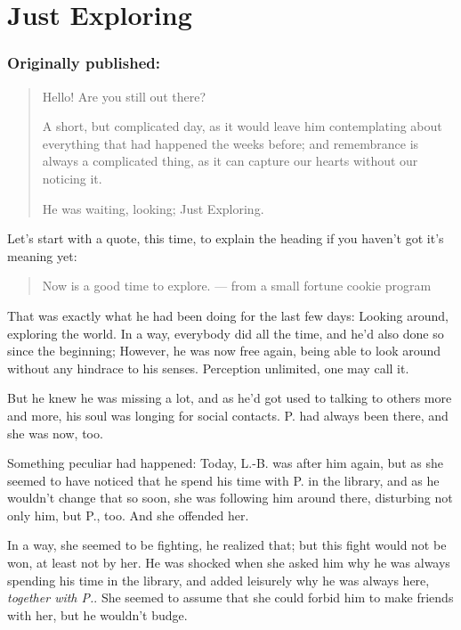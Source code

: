 \chapter{Just Exploring}
\label{cha:just-exploring}
\subsection*{Originally published: }
\begin{quote}
Hello! Are you still out there?

A short, but complicated day, as it would leave him contemplating about everything that had happened the weeks before; and remembrance is always a complicated thing, as it can capture our hearts without our noticing it.

He was waiting, looking; Just Exploring.
\end{quote}

Let's start with a quote, this time, to explain the heading if you haven't got it's meaning yet: 
\begin{verse}
  Now is a good time to explore.
  --- from a small fortune cookie program
\end{verse}
That was exactly what he had been doing for the last few days: Looking around, exploring the world. In a way, everybody did all the time, and he'd also done so since the beginning; However, he was now free again, being able to look around without any hindrace to his senses. 
Perception unlimited, one may call it.

But he knew he was missing a lot, and as he'd got used to talking to others more and more, his soul was longing for social contacts. 
P. had always been there, and she was now, too.

Something peculiar had happened: Today, L.-B. was after him again, but as she seemed to have noticed that he spend his time with P. in the library, and as he wouldn't change that so soon, she was following him around there, disturbing not only him, but P., too. 
And she offended her.

In a way, she seemed to be fighting, he realized that; but this fight would not be won, at least not by her. 
He was shocked when she asked him why he was always spending his time in the library, and added leisurely why he was always here, \emph{together with P.}. She seemed to assume that she could forbid him to make friends with her, but he wouldn't budge.

